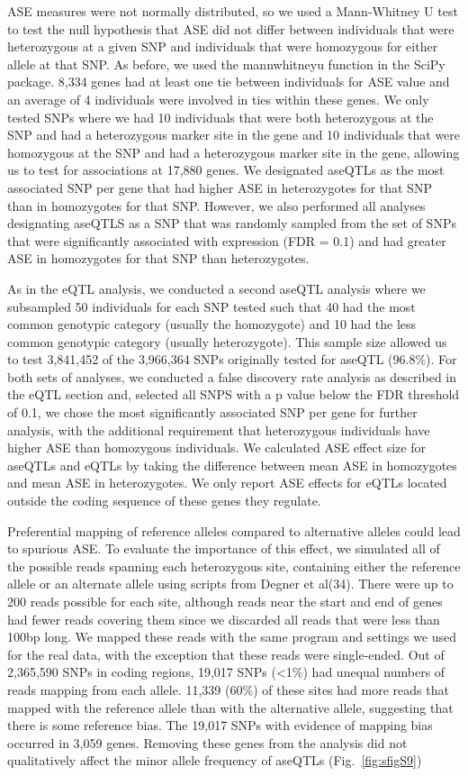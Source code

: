 ASE measures were not normally distributed, so we used a Mann-Whitney U test to test the null hypothesis that ASE did not differ between individuals that were heterozygous at a given SNP and individuals that were homozygous for either allele at that SNP. As before, we used the mannwhitneyu function in the SciPy package. 8,334 genes had at least one tie between individuals for ASE value and an average of 4 individuals were involved in ties within these genes. We only tested SNPs where we had 10 individuals that were both heterozygous at the SNP and had a heterozygous marker site in the gene and 10 individuals that were homozygous at the SNP and had a heterozygous marker site in the gene, allowing us to test for associations at 17,880 genes. We designated aseQTLs as the most associated SNP per gene that had higher ASE in heterozygotes for that SNP than in homozygotes for that SNP. However, we also performed all analyses designating aseQTLS as a SNP that was randomly sampled from the set of SNPs that were significantly associated with expression (FDR = 0.1) and had greater ASE in homozygotes for that SNP than heterozygotes.

As in the eQTL analysis, we conducted a second aseQTL analysis where we subsampled 50 individuals for each SNP tested such that 40 had the most common genotypic category (usually the homozygote) and 10 had the less common genotypic category (usually heterozygote). This sample size allowed us to test 3,841,452 of the 3,966,364 SNPs originally tested for aseQTL (96.8\%). For both sets of analyses, we conducted a false discovery rate analysis as described in the eQTL section and, selected all SNPS with a p value below the FDR threshold of 0.1, we chose the most significantly associated SNP per gene for further analysis, with the additional requirement that heterozygous individuals have higher ASE than homozygous individuals. We calculated ASE effect size for aseQTLs and eQTLs by taking the difference between mean ASE in homozygotes and mean ASE in heterozygotes. We only report ASE effects for eQTLs located outside the coding sequence of these genes they regulate.

Preferential mapping of reference alleles compared to alternative alleles could lead to spurious ASE. To evaluate the importance of this effect, we simulated all of the possible reads spanning each heterozygous site, containing either the reference allele or an alternate allele using scripts from Degner et al(34). There were up to 200 reads possible for each site, although reads near the start and end of genes had fewer reads covering them since we discarded all reads that were less than 100bp long. We mapped these reads with the same program and settings we used for the real data, with the exception that these reads were single-ended.  Out of 2,365,590 SNPs in coding regions, 19,017 SNPs (\textless1\%) had unequal numbers of reads mapping from each allele. 11,339 (60\%) of these sites had more reads that mapped with the reference allele than with the alternative allele, suggesting that there is some reference bias. The 19,017 SNPs with evidence of mapping bias occurred in 3,059 genes. Removing these genes from the analysis did not qualitatively affect the minor allele frequency of aseQTLs (Fig.~\ref{fig:sfigS9})

